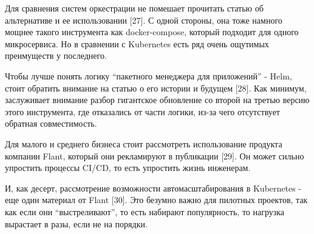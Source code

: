 Для сравнения систем оркестрации не помешает прочитать статью об альтернативе и ее использовании [27]. С одной стороны, она тоже намного мощнее такого инструмента как docker-compose, который подходит для одного микросервиса. Но в сравнении с Kubernetes есть ряд очень ощутимых преимуществ у последнего.

Чтобы лучше понять логику “пакетного менеджера для приложений” - Helm, стоит обратить внимание на статью о его истории и будущем [28]. Как минимум, заслуживает внимание разбор гигантское обновление со второй на третью версию этого инструмента, где отказались от части логики, из-за чего отсутствует обратная совместимость.

Для малого и среднего бизнеса стоит рассмотреть использование продукта компании Flant, который они рекламируют в публикации [29]. Он может сильно упростить процессы CI/CD, то есть упростить жизнь инженерам.

И, как десерт, рассмотрение возможности автомасштабирования в Kubernetes - еще один материал от Flant [30]. Это безумно важно для пилотных проектов, так как если они “выстреливают”, то есть набирают популярность, то нагрузка вырастает в разы, если не на порядки.


